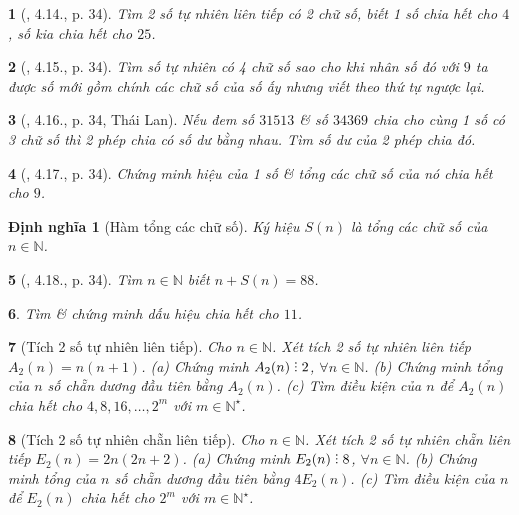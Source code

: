 \documentclass{article}
\newtheorem{baitoan}{}
\newtheorem{dinhnghia}{Định nghĩa}
\DeclareRobustCommand{\divby}{%
	\mathrel{\vbox{\baselineskip.65ex\lineskiplimit0pt\hbox{.}\hbox{.}\hbox{.}}}%
}
\begin{document}
\begin{baitoan}[\cite{Binh_boi_duong_Toan_6_tap_1}, 4.14., p. 34]
	Tìm 2 số tự nhiên liên tiếp có 2 chữ số, biết 1 số chia hết cho $4$, số kia chia hết cho $25$.
\end{baitoan}

\begin{baitoan}[\cite{Binh_boi_duong_Toan_6_tap_1}, 4.15., p. 34]
	Tìm số tự nhiên có 4 chữ số sao cho khi nhân số đó với $9$ ta được số mới gồm chính các chữ số của số ấy nhưng viết theo thứ tự ngược lại.
\end{baitoan}

\begin{baitoan}[\cite{Binh_boi_duong_Toan_6_tap_1}, 4.16., p. 34, Thái Lan]
	Nếu đem số $31513$ \& số $34369$ chia cho cùng 1 số có 3 chữ số thì 2 phép chia có số dư bằng nhau. Tìm số dư của 2 phép chia đó.
\end{baitoan}

\begin{baitoan}[\cite{Binh_boi_duong_Toan_6_tap_1}, 4.17., p. 34]
	Chứng minh hiệu của 1 số \& tổng các chữ số của nó chia hết cho $9$.
\end{baitoan}

\begin{dinhnghia}[Hàm tổng các chữ số]
	Ký hiệu $S(n)$ là tổng các chữ số của $n\in\mathbb{N}$.
\end{dinhnghia}

\begin{baitoan}[\cite{Binh_boi_duong_Toan_6_tap_1}, 4.18., p. 34]
	 Tìm $n\in\mathbb{N}$ biết $n + S(n) = 88$.
\end{baitoan}

\begin{baitoan}
	Tìm \& chứng minh dấu hiệu chia hết cho $11$.
\end{baitoan}

\begin{baitoan}[Tích 2 số tự nhiên liên tiếp]
	Cho $n\in\mathbb{N}$. Xét tích 2 số tự nhiên liên tiếp $A_2(n) = n(n + 1)$. (a) Chứng minh $A_2(n)\divby2$, $\forall n\in\mathbb{N}$. (b) Chứng minh tổng của $n$ số chẵn dương đầu tiên bằng $A_2(n)$. (c) Tìm điều kiện của $n$ để $A_2(n)$ chia hết cho $4,8,16,\ldots,2^m$ với $m\in\mathbb{N}^\star$.
\end{baitoan}

\begin{baitoan}[Tích 2 số tự nhiên chẵn liên tiếp]
	Cho $n\in\mathbb{N}$. Xét tích 2 số tự nhiên chẵn liên tiếp $E_2(n) = 2n(2n + 2)$. (a) Chứng minh $E_2(n)\divby8$, $\forall n\in\mathbb{N}$. (b) Chứng minh tổng của $n$ số chẵn dương đầu tiên bằng $4E_2(n)$. (c) Tìm điều kiện của $n$ để $E_2(n)$ chia hết cho $2^m$ với $m\in\mathbb{N}^\star$.
\end{baitoan}
\end{document}
